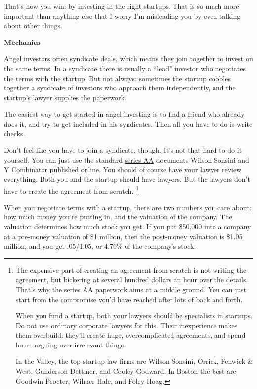 \documentclass[12pt]{book}
\begin{document}
That's how you win: by investing in the right startups. That is so much
more important than anything else that I worry I'm misleading you by
even talking about other things.

\textbf{Mechanics}

Angel investors often syndicate deals, which means they join together to
invest on the same terms. In a syndicate there is usually a ``lead''
investor who negotiates the terms with the startup. But not always:
sometimes the startup cobbles together a syndicate of investors who
approach them independently, and the startup's lawyer supplies the
paperwork.

The easiest way to get started in angel investing is to find a friend
who already does it, and try to get included in his syndicates. Then all
you have to do is write checks.

Don't feel like you have to join a syndicate, though. It's not that hard
to do it yourself. You can just use the standard
\href{http://ycombinator.com/seriesaa.html}{series AA} documents Wilson
Sonsini and Y Combinator published online. You should of course have
your lawyer review everything. Both you and the startup should have
lawyers. But the lawyers don't have to create the agreement from
scratch. \footnote{The expensive part of creating an agreement from scratch is not
writing the agreement, but bickering at several hundred dollars an hour
over the details. That's why the series AA paperwork aims at a middle
ground. You can just start from the compromise you'd have reached after
lots of back and forth.

When you fund a startup, both your lawyers should be specialists in
startups. Do not use ordinary corporate lawyers for this. Their
inexperience makes them overbuild: they'll create huge, overcomplicated
agreements, and spend hours arguing over irrelevant things.

In the Valley, the top startup law firms are Wilson Sonsini, Orrick,
Fenwick \& West, Gunderson Dettmer, and Cooley Godward. In Boston the
best are Goodwin Procter, Wilmer Hale, and Foley Hoag.}

When you negotiate terms with a startup, there are two numbers you care
about: how much money you're putting in, and the valuation of the
company. The valuation determines how much stock you get. If you put
\$50,000 into a company at a pre-money valuation of \$1 million, then
the post-money valuation is \$1.05 million, and you get .05/1.05, or
4.76\% of the company's stock.
\end{document}
